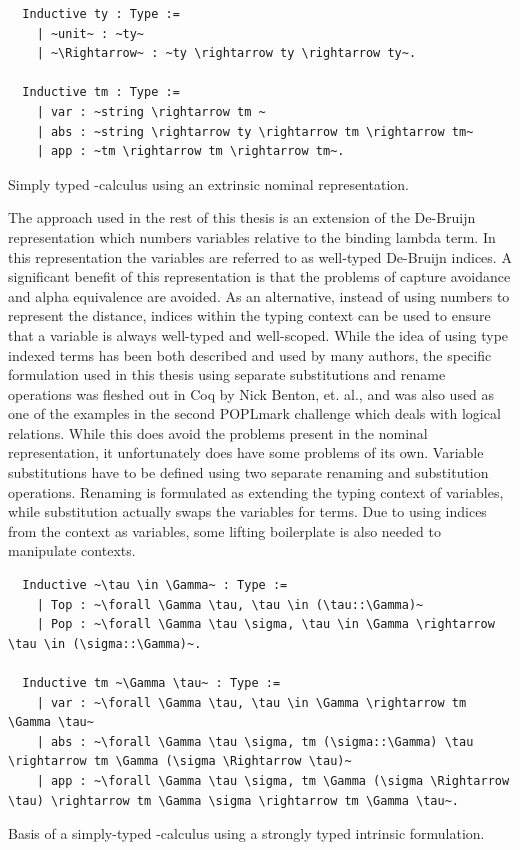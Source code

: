 \documentclass[11pt, final]{article}
\begin{document}
\begin{listing}[h]
  \begin{verbatim}
  Inductive ty : Type :=
    | ~unit~ : ~ty~
    | ~\Rightarrow~ : ~ty \rightarrow ty \rightarrow ty~.

  Inductive tm : Type :=
    | var : ~string \rightarrow tm ~
    | abs : ~string \rightarrow ty \rightarrow tm \rightarrow tm~
    | app : ~tm \rightarrow tm \rightarrow tm~.
  \end{verbatim}
  \caption{Simply typed \lambda-calculus using an extrinsic nominal representation.}
  \label{lst:nominal_stlc}
\end{listing}

The approach used in the rest of this thesis is an extension of the De-Bruijn representation which numbers variables relative to the binding lambda term.
In this representation the variables are referred to as well-typed De-Bruijn indices.
A significant benefit of this representation is that the problems of capture avoidance and alpha equivalence are avoided.
As an alternative, instead of using numbers to represent the distance, indices within the typing context can be used to ensure that a variable is always well-typed and well-scoped.
While the idea of using type indexed terms has been both described and used by many authors\cite{Altenkirch99}\cite{McBride04}\cite{Adams06}, the specific formulation used in this thesis using separate substitutions and rename operations was fleshed out in Coq by Nick Benton, et. al.\cite{Benton2011}, and was also used as one of the examples in the second POPLmark challenge which deals with logical relations\cite{poplmark_reloaded}.
While this does avoid the problems present in the nominal representation, it unfortunately does have some problems of its own.
Variable substitutions have to be defined using two separate renaming and substitution operations.
Renaming is formulated as extending the typing context of variables, while substitution actually swaps the variables for terms.
Due to using indices from the context as variables, some lifting boilerplate is also needed to manipulate contexts.

\begin{listing}[h]
  \begin{verbatim}
  Inductive ~\tau \in \Gamma~ : Type :=
    | Top : ~\forall \Gamma \tau, \tau \in (\tau::\Gamma)~
    | Pop : ~\forall \Gamma \tau \sigma, \tau \in \Gamma \rightarrow \tau \in (\sigma::\Gamma)~.

  Inductive tm ~\Gamma \tau~ : Type :=
    | var : ~\forall \Gamma \tau, \tau \in \Gamma \rightarrow tm \Gamma \tau~
    | abs : ~\forall \Gamma \tau \sigma, tm (\sigma::\Gamma) \tau \rightarrow tm \Gamma (\sigma \Rightarrow \tau)~
    | app : ~\forall \Gamma \tau \sigma, tm \Gamma (\sigma \Rightarrow \tau) \rightarrow tm \Gamma \sigma \rightarrow tm \Gamma \tau~.
  \end{verbatim}
  \caption{Basis of a simply-typed \lambda-calculus using a strongly typed intrinsic formulation.}
  \label{lst:strong_stlc}
\end{listing}
\end{document}
